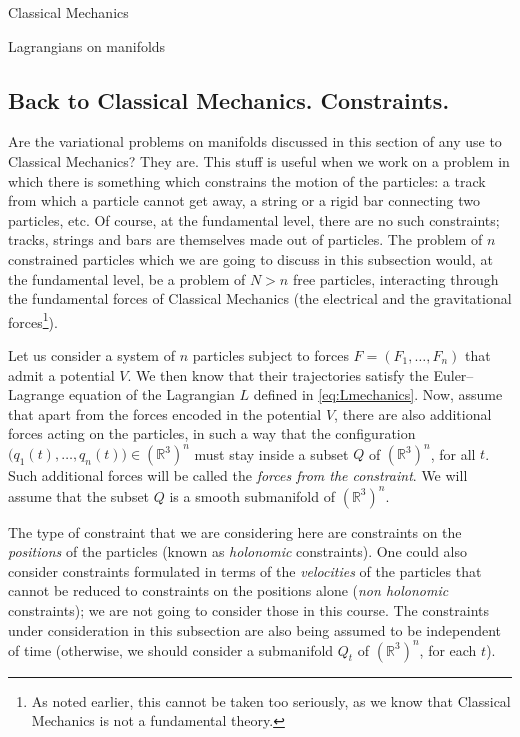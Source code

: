 \documentclass[oneside,a4paper,11pt]{amsbook}
\newcommand{\R}{\mathds R}
\theoremstyle{remark}\newtheorem{exercise}{Exercise}[chapter]
\theoremstyle{plain}\newtheorem{teo}{Theorem}[section]
\theoremstyle{plain}\newtheorem{lem}[teo]{Lemma}
\theoremstyle{plain}\newtheorem{prop}[teo]{Proposition}
\theoremstyle{plain}\newtheorem{cor}[teo]{Corollary}
\theoremstyle{definition}\newtheorem{defin}[teo]{Definition}
\theoremstyle{remark}\newtheorem{rem}[teo]{Remark}
\theoremstyle{definition}\newtheorem{notation}[teo]{Notation}
\theoremstyle{definition}\newtheorem{convention}[teo]{Convention}
\theoremstyle{definition}\newtheorem{example}[teo]{Example}
\numberwithin{section}{chapter}
\numberwithin{equation}{section}
\begin{document}
\begin{chapter}{Classical Mechanics}
\begin{section}{Lagrangians on manifolds}
\subsection{Back to Classical Mechanics. Constraints.}\label{sub:constraints}
Are the variational problems on manifolds discussed in
this section of any use to Classical Mechanics? They are. This stuff is useful when we work on a problem in which
there is something which constrains the motion of the particles: a track from which a particle cannot get away,
a string or a rigid bar connecting two particles, etc. Of course, at the fundamental level, there are no such constraints;
tracks, strings and bars are themselves made out of particles. The problem of $n$ constrained particles which we are
going to discuss in this subsection would, at the fundamental level, be a problem of $N>n$ free particles,
interacting through the fundamental forces of Classical Mechanics (the electrical and the gravitational forces\footnote{%
As noted earlier, this cannot be taken too seriously, as we know that Classical Mechanics is not a fundamental theory.}).

Let us consider a system of $n$ particles subject to forces $F=(F_1,\ldots,F_n)$ that admit a potential $V$.
We then know that their
trajectories satisfy the Euler--Lagrange equation of the Lagrangian $L$ defined in \eqref{eq:Lmechanics}. Now,
assume that apart from the forces encoded in the potential $V$, there are also additional forces acting on the
particles, in such a way that the configuration $\big(q_1(t),\ldots,q_n(t)\big)\in(\R^3)^n$ must stay
inside a subset $Q$ of $(\R^3)^n$, for all $t$. Such additional forces will be called the {\em forces from the constraint}.
We will assume that the subset $Q$ is a smooth submanifold of $(\R^3)^n$.

The type of constraint that we are considering
here are constraints on the {\em positions\/} of the particles (known as {\em holonomic\/} constraints).
One could also consider constraints formulated in terms of the {\em velocities\/} of the particles that cannot
be reduced to constraints on the positions alone ({\em non holonomic\/} constraints); we are not going to consider
those in this course. The constraints under consideration in this subsection are also being assumed to be independent of time
(otherwise, we should consider a submanifold $Q_t$ of $(\R^3)^n$, for each $t$).


\end{section}
\end{chapter}
\end{document}
